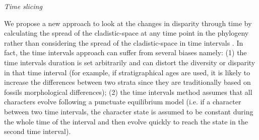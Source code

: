 \documentclass[12pt,letterpaper]{article}
\renewcommand{\subsection}[1]{%
\bigskip
\begin{center}
\begin{large}
\normalfont\itshape #1
\end{large}
\end{center}}
\begin{document}
\subsection{Time slicing}
We propose a new approach to look at the changes in disparity through time by calculating the spread of the cladistic-space at any time point in the phylogeny rather than considering the spread of the cladistic-space in time intervals \citep[e.g.][]{Brusatte12092008,brusattedinosaur2012,toljagictriassic-jurassic2013}. In fact, the time intervals approach can suffer from several biases namely: (1) the time intervals duration is set arbitrarily and can distort the diversity or disparity in that time interval (for example, if stratigraphical ages are used, it is likely to increase the differences between two strata since they are traditionally based on fossils morphological differences); (2) the time intervals method assumes that all characters evolve following a punctuate equilibrium model (i.e. if a character between two time intervals, the character state is assumed to be constant during the whole time of the interval and then evolve quickly to reach the state in the second time interval).
\end{document}
